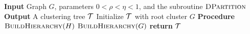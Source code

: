 \begin{algorithm}[H]
    \caption{Top-down hierarchical clustering with demands}
    \label{algo:hclustering}
    \textbf{Input} Graph $G$, parameters $0<\rho<\eta<1$, and the subroutine $\textsc{DPartition}$\;
    \textbf{Output} A clustering tree $\mathcal{T}$\;
    Initialize $\mathcal{T}$ with root cluster $G$\;
    \textbf{Procedure} $\textsc{BuildHierarchy}(H)$\;
    \Indp
    \Indm
    $\textsc{BuildHierarchy}(G)$\;
    \textbf{return} $\mathcal{T}$\;
\end{algorithm}
